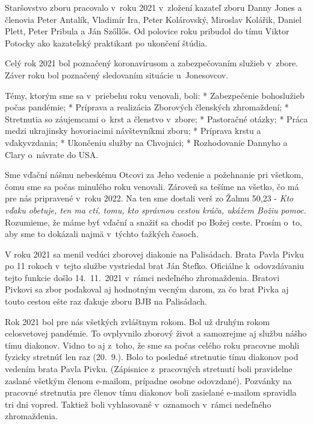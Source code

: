 Staršovstvo zboru pracovalo v~roku 2021 v~zložení kazateľ zboru Danny Jones a členovia Peter Antalík, Vladimír Ira, Peter Kolárovský, Miroslav Kolářik, Daniel Plett, Peter Pribula a Ján Szőllős. Od polovice roku pribudol do tímu Viktor Potocky ako kazateľský praktikant po ukončení štúdia.

Celý rok 2021 bol poznačený koronavírusom a zabezpečovaním služieb v~zbore. Záver roku bol poznačený sledovaním situácie u~Jonesovcov. 

Témy, ktorým sme sa v~priebehu roku venovali, boli:
\begitems
* Zabezpečenie bohoslužieb počas pandémie; 
* Príprava a realizácia Zborových členských zhromaždení;
* Stretnutia so záujemcami o~krst a členstvo v~zbore;
* Pastoračné otázky;
* Práca medzi ukrajinsky hovoriacimi návštevníkmi zboru;
* Príprava krstu a vďakyvzdania;
* Ukončeniu služby na Chvojnici;
* Rozhodovanie Dannyho a Clary o~návrate do USA.
\enditems

Sme vďační nášmu nebeskému Otcovi za Jeho vedenie a požehnanie pri všetkom, čomu sme sa počas minulého roku venovali. Zároveň sa tešíme na všetko, čo má pre nás pripravené v~roku 2022. Na ten sme dostali verš zo Žalmu 50,23 - {\it Kto vďaku obetuje, ten ma ctí, tomu, kto správnou cestou kráča, ukážem Božiu pomoc.} Rozumieme, že máme byť vďační a snažiť sa chodiť po Božej ceste. Prosím o~to, aby sme to dokázali najmä v~týchto ťažkých časoch.




V roku 2021 sa menil vedúci zborovej diakonie na Palisádach. Brata Pavla Pivku po 11 rokoch v~tejto službe vystriedal brat Ján Štefko. Oficiálne k~odovzdávaniu tejto funkcie došlo 14.~11.~2021 v~rámci nedeľného zhromaždenia. Bratovi Pivkovi sa zbor poďakoval aj hodnotným vecným darom, za čo brat Pivka aj touto cestou ešte raz ďakuje zboru BJB na Palisádach.

Rok 2021 bol pre nás všetkých zvláštnym rokom. Bol už druhým rokom celosvetovej pandémie. To ovplyvnilo zborový život a samozrejme aj službu nášho tímu diakonov. Vidno to aj z~toho, že sme sa počas celého roku pracovne mohli fyzicky stretnúť len raz (20.~9.). Bolo to posledné stretnutie tímu diakonov pod vedením brata Pavla Pivku. (Zápisnice z~pracovných stretnutí boli pravidelne zaslané všetkým členom e-mailom, prípadne osobne odovzdané). Pozvánky na pracovné stretnutia pre členov tímu diakonov boli zasielané e-mailom spravidla tri dni vopred. Taktiež boli vyhlasované v~oznamoch v~rámci nedeľného zhromaždenia.

